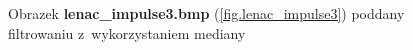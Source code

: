 \documentclass{classrep}
\begin{document}
\begin{figure}
{{  \label{fig.lenac_impulse3_median_5x5}
 }
}
\caption{Obrazek \textbf{lenac\_impulse3.bmp} (\ref{fig.lenac_impulse3}) poddany filtrowaniu z~wykorzystaniem mediany}
\label{fig.lenac_impulse3_median}
\end{figure}
\end{document}

